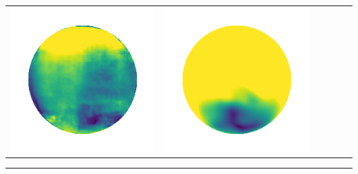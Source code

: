 \begin{center}
\begin{tabularx}{\linewidth}{@{}Y@{}Y@{}Y@{}Y@{}Y@{}Y@{}}
\includegraphics[width=\linewidth]{semisynthetic/20150514_13_marrnet_err.png} &
\includegraphics[width=\linewidth]{semisynthetic/20150514_13_ef_err.png} \\
\end{tabularx}
\begin{center}\rule{0.5\linewidth}{\linethickness}\end{center}


\end{center}
